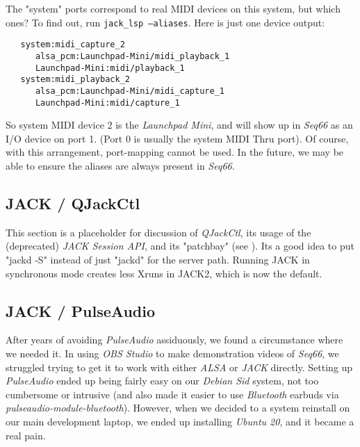   The "system" ports correspond to real MIDI devices on this system, but which
   ones?  To find out, run \texttt{jack\_lsp --aliases}.  Here is just one
   device output:

   \begin{verbatim}
   system:midi_capture_2
      alsa_pcm:Launchpad-Mini/midi_playback_1
      Launchpad-Mini:midi/playback_1
   system:midi_playback_2
      alsa_pcm:Launchpad-Mini/midi_capture_1
      Launchpad-Mini:midi/capture_1
   \end{verbatim}

   So system MIDI device 2 is the \textsl{Launchpad Mini}, and
   will show up in \textsl{Seq66} as an I/O device on port 1.
   (Port 0 is usually the system MIDI Thru port).
   Of course, with this arrangement, port-mapping cannot be used.
   In the future, we may be able to ensure the aliases are always
   present in \textsl{Seq66}.

\subsection{JACK / QJackCtl}
\label{subsec:jack_qjackctl}

   This section is a placeholder for discussion of \textsl{QJackCtl},
   its usage of the (deprecated) \textsl{JACK Session API}, and
   its "patchbay" (see \cite{patchbay}).
   Its a good idea to put "jackd -S" instead of just "jackd" for the server
   path. Running JACK in synchronous mode creates less Xruns in JACK2, which
   is now the default.
   
\subsection{JACK / PulseAudio}
\label{subsec:jack_pulseaudio}

   After years of avoiding \textsl{PulseAudio} assiduously, we found a
   circumstance where we needed it.
   In using \textsl{OBS Studio} to make demonstration videos of \textsl{Seq66},
   we struggled trying to get it to work with either
   \textsl{ALSA} or \textsl{JACK} directly.
   Setting up \textsl{PulseAudio} ended up being fairly easy on our
   \textsl{Debian Sid} system, not too
   cumbersome or intrusive (and also made it easier to use
   \textsl{Bluetooth} earbuds via \textsl{pulseaudio-module-bluetooth}).
   However, when we decided to a system reinstall on our main development
   laptop, we ended up installing \textsl{Ubuntu 20}, and it became a real
   pain.

